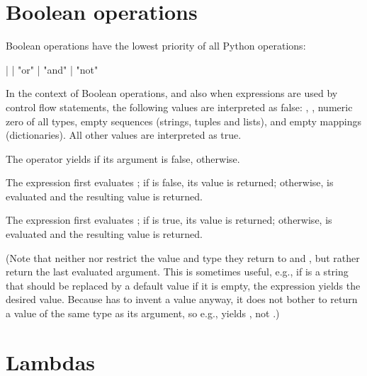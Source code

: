 \section{Boolean operations\label{Booleans}}

Boolean operations have the lowest priority of all Python operations:

\begin{productionlist}
             { | }
             { |  "or" }
             { |  "and" }
             { | "not" }
\end{productionlist}

In the context of Boolean operations, and also when expressions are
used by control flow statements, the following values are interpreted
as false: , , numeric zero of all types, empty
sequences (strings, tuples and lists), and empty mappings (dictionaries).
All other values are interpreted as true.

The operator  yields  if its argument is false,
 otherwise.

The expression  first evaluates ; if
 is false, its value is returned; otherwise,  is
evaluated and the resulting value is returned.

The expression  first evaluates ; if
 is true, its value is returned; otherwise,  is
evaluated and the resulting value is returned.

(Note that neither  nor  restrict the value
and type they return to  and , but rather return the
last evaluated argument.
This is sometimes useful, e.g., if  is a string that should be
replaced by a default value if it is empty, the expression
 yields the desired value.  Because  has to
invent a value anyway, it does not bother to return a value of the
same type as its argument, so e.g.,  yields ,
not .)

\section{Lambdas\label{lambdas}}

